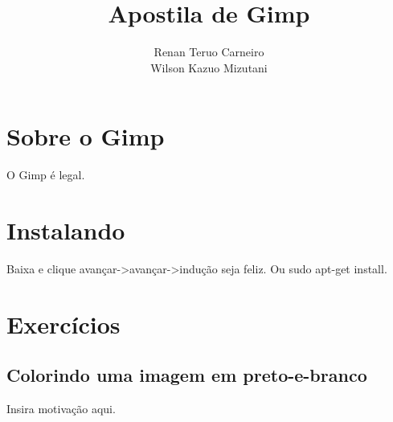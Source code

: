 \documentclass[12pt,onecolumn]{article}
\begin{document}
\title{Apostila de Gimp}
\author{Renan Teruo Carneiro \\ Wilson Kazuo Mizutani}
\maketitle

\section{Sobre o Gimp}
  O Gimp é legal.

\section{Instalando}
  Baixa e clique avançar->avançar->indução seja feliz.
  Ou sudo apt-get install.

\section{Exercícios}

  \subsection{Colorindo uma imagem em preto-e-branco}
    Insira motivação aqui.
\end{document}
